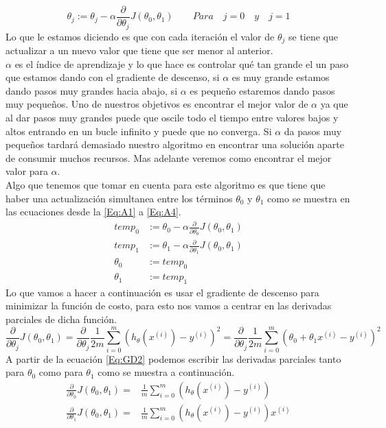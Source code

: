 \documentclass{report}
\begin{document}
\begin{equation}
	\theta_j := \theta_j -\alpha\frac{\partial}{\partial\theta_j}J(\theta_0,\theta_1)\qquad Para\quad j=0\quad y\quad j=1
	\label{Eq:DG}
\end{equation}
Lo que le estamos diciendo es que con cada iteración el valor de $\theta_j$ se tiene que actualizar a un nuevo valor que tiene que ser menor al anterior.\\$\alpha$ es el índice de aprendizaje y lo que hace es controlar qué tan grande el un paso que estamos dando con el gradiente de descenso, si $\alpha$ es muy grande estamos dando pasos muy grandes hacia abajo, si $\alpha$ es pequeño estaremos dando pasos muy pequeños. Uno de nuestros objetivos es encontrar el mejor valor de $\alpha$ ya que al dar pasos muy grandes puede que oscile todo el tiempo entre valores bajos y altos entrando en un bucle infinito y puede que no converga. Si $\alpha$ da pasos muy pequeños tardará demasiado nuestro algoritmo en encontrar una solución aparte de consumir muchos recursos. Mas adelante veremos como encontrar el mejor valor para $\alpha$.\\Algo que tenemos que tomar en cuenta para este algoritmo es que tiene que haber una actualización simultanea entre los términos $\theta_0$ y $\theta_1$ como se muestra en las ecuaciones desde la \ref{Eq:A1} a \ref{Eq:A4}.
\begin{align}
	temp_0&:= \theta_0 -\alpha\frac{\partial}{\partial\theta_0}J(\theta_0,\theta_1)\label{Eq:A1}\\
	temp_1&:= \theta_1 -\alpha\frac{\partial}{\partial\theta_1}J(\theta_0,\theta_1)\label{Eq:A2}\\
	\theta_0&:=temp_0\label{Eq:A3}\\
	\theta_1&:=temp_1\label{Eq:A4}
\end{align}
Lo que vamos a hacer a continuación es usar el gradiente de descenso para minimizar la función de costo, para esto nos vamos a centrar en las derivadas parciales de dicha función.
\begin{equation}
	\frac{\partial}{\partial\theta_j}J(\theta_0, \theta_1)=\frac{\partial}{\partial\theta_j}\frac{1}{2m}\sum_{i=0}^{m}(h_\theta(x^{(i)})-y^{(i)})^2=\frac{\partial}{\partial\theta_j}\frac{1}{2m}\sum_{i=0}^{m}(\theta_0+\theta_1x^{(i)}-y^{(i)})^2
	\label{Eq:GD2}
\end{equation}
A partir de la ecuación \ref{Eq:GD2} podemos escribir las derivadas parciales tanto para $\theta_0$ como para $\theta_1$ como se muestra a continuación.
\begin{align}
	\frac{\partial}{\partial\theta_0}J(\theta_0, \theta_1)=&\frac{1}{m}\sum_{i=0}^{m}(h_\theta(x^{(i)})-y^{(i)})\label{Eq:AI1}\\
	\frac{\partial}{\partial\theta_1}J(\theta_0, \theta_1)=&\frac{1}{m}\sum_{i=0}^{m}(h_\theta(x^{(i)})-y^{(i)})x^{(i)}\label{Eq:AI2}
\end{align}
\end{document}
